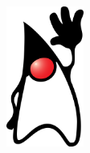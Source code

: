\documentclass[letterpaper,12pt]{exam}
\begin{document}
\begin{figure}[b]\label{end}
	\center
	\includegraphics[width=1in]{../duke.png}
\end{figure}
\end{document}
